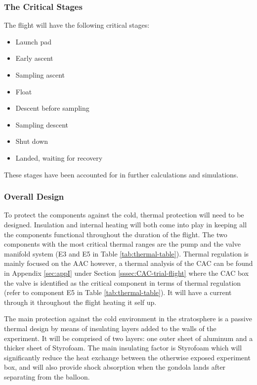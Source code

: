 \documentclass[a4paper,12pt,twoside]{article}
\begin{document}
\subsubsection{The Critical Stages}
The flight will have the following critical stages:
\begin{itemize}
    \item Launch pad
    \item Early ascent
    \item Sampling ascent
    \item Float
    \item Descent before sampling
    \item Sampling descent
    \item Shut down
    \item Landed, waiting for recovery
\end{itemize}
These stages have been accounted for in further calculations and simulations.

\subsubsection{Overall Design}
To protect the components against the cold, thermal protection will need to be designed. Insulation and internal heating will both come into play in keeping all the components functional throughout the duration of the flight. The two components with the most critical thermal ranges are the pump and the valve manifold system (E3 and E5 in Table \ref{tab:thermal-table}). Thermal regulation is mainly focused on the AAC however, a thermal analysis of the CAC can be found in Appendix \ref{sec:appI} under Section \ref{sssec:CAC-trial-flight} where the  CAC box the valve is identified as the critical component in terms of thermal regulation (refer to component E5 in Table \ref{tab:thermal-table}). It will have a current through it throughout the flight heating it self up.

The main protection against the cold environment in the stratosphere is a passive thermal design by means of  insulating layers added to the walls of the experiment. It will be comprised of two layers: one outer sheet of aluminum and a thicker sheet of Styrofoam. The main insulating factor is Styrofoam which will significantly reduce the heat exchange between the otherwise exposed experiment box, and will also provide shock absorption when the gondola lands after separating from the balloon.
\end{document}

